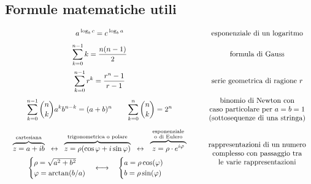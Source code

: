 \subsection{Formule matematiche utili}
\vspace{5pt}
\[\begin{array}{c c}
	\displaystyle a \, ^{\log_b c} = c \, ^{\log_b a} & \quad \text{esponenziale di un logaritmo} \\[7pt]
	\displaystyle \sum_{k=0}^{n-1} k = \frac{n (n - 1)}{2} & \quad \text{formula di Gauss} \\[15pt]
	\displaystyle \sum_{k=0}^{n-1} r^k = \frac{r^n - 1}{r - 1} & \quad \text{serie geometrica di ragione \(r\)} \\[15pt]
	\displaystyle\sum_{k=0}^{n-1} \binom{n}{k} a^k b^{n-k} = (a + b)^n \qquad \sum_{k=0}^{n} \binom{n}{k} = 2^n & \quad \begin{array}{c}
		\text{binomio di Newton con} \\ \text{caso particolare per } a = b = 1 \\ \text{(sottosequenze di una stringa)}
	\end{array} \\[20pt]
	\begin{array}{c}
		\overbrace{z = a + ib}^{\text{cartesiana}} \;\; \leftrightarrow \;\; \overbrace{z = \rho (\cos \varphi + i \sin \varphi)}^{\text{trigonometrica o polare}} \;\; \leftrightarrow \;\; \overbrace{\; z = \rho \cdot e^{i \varphi} \;}^{\substack{\text{esponenziale} \\ \text{o di Eulero}}} \\[5pt]
		\begin{cases}
			\rho = \sqrt{a^2 + b^2} \\
			\varphi = \arctan(b / a)
		\end{cases} \longleftrightarrow \quad \begin{cases}
			a = \rho \cos(\varphi) \\
			b = \rho \sin(\varphi)
		\end{cases}
	\end{array} & \quad \begin{array}{c}
		\text{rappresentazioni di un numero} \\ \text{complesso con passaggio tra} \\ \text{le varie rappresentazioni}
	\end{array}
\end{array}\]
